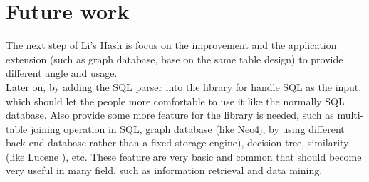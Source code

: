 \chapter{Future work}
\label{chapter:future-work}

\baselineskip=26pt
\thispagestyle{empty}

The next step of Li's Hash is focus on the improvement and the application extension (such as graph database, base on the same table design) to provide different angle and usage.\\

Later on, by adding the SQL parser into the library for handle SQL as the input, which should let the people more comfortable to use it like the normally SQL database. Also provide some more feature for the library is needed, such as multi-table joining operation in SQL, graph database (like Neo4j\cite{web:neo4j:home-page}, by using different back-end database rather than a fixed storage engine), decision tree, similarity (like Lucene \cite{web:wiki:lucene}), etc. These feature are very basic and common that should become very useful in many field, such as information retrieval and data mining.\\


